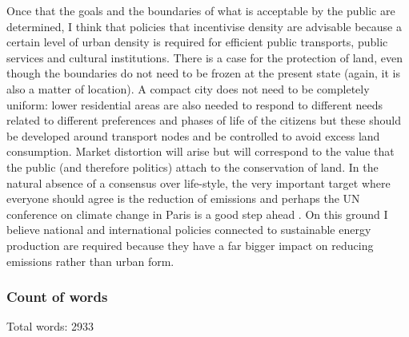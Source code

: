 \documentclass [a4paper,12pt]{article} %
\begin{document}
Once that the goals and the boundaries of what is acceptable by the public are determined, I think that policies that incentivise density are advisable because a certain level of urban density is required for efficient public transports, public services and cultural institutions. There is a case for the protection of land, even though the boundaries do not need to be frozen at the present state (again, it is also a matter of location). A compact city does not need to be completely uniform: lower residential areas are also needed to respond to different needs related to different preferences and phases of life of the citizens but these should be developed around transport nodes and be controlled to avoid excess land consumption. Market distortion will arise but will correspond to the value that the public (and therefore politics) attach to the conservation of land. 
In the natural absence of a consensus over life-style, the very important target where everyone should agree is the reduction of emissions and perhaps the UN conference on climate change in Paris is a good step ahead \citep{COP21}. On this ground I believe national and international policies connected to sustainable energy production are required because they have a far bigger impact on reducing emissions rather than urban form.

\clearpage




\subsubsection*{Count of words} 
Total words: 2933
\end{document}
